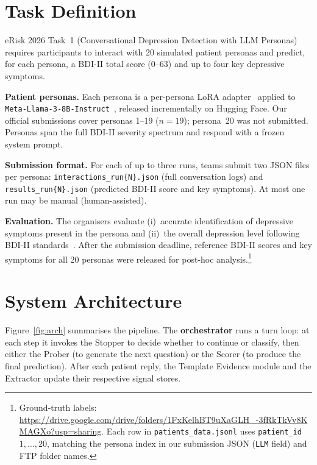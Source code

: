 \documentclass[]{ceurart}
\begin{document}
\section{Task Definition}\label{sec:task}

eRisk 2026 Task~1 (Conversational Depression Detection with LLM Personas) requires participants to interact with 20 simulated patient personas and predict, for each persona, a BDI-II total score (0--63) and up to four key depressive symptoms.

\textbf{Patient personas.}
Each persona is a per-persona LoRA adapter~\cite{Hu2022lora} applied to \texttt{Meta-Llama-3-8B-Instruct}~\cite{Dubey2024llama3}, released incrementally on Hugging Face.
Our official submissions cover personas 1--19 ($n=19$); persona~20 was not submitted.
Personas span the full BDI-II severity spectrum and respond with a frozen system prompt.

\textbf{Submission format.}
For each of up to three runs, teams submit two JSON files per persona: \texttt{interactions\_run\{N\}.json} (full conversation logs) and \texttt{results\_run\{N\}.json} (predicted BDI-II score and key symptoms).
At most one run may be manual (human-assisted).

\textbf{Evaluation.}
The organisers evaluate (i)~accurate identification of depressive symptoms present in the persona and (ii)~the overall depression level following BDI-II standards~\cite{PerezEtAl2026eRiskWorkingNotes}.
After the submission deadline, reference BDI-II scores and key symptoms for all 20 personas were released for post-hoc analysis.\footnote{Ground-truth labels: \url{https://drive.google.com/drive/folders/1FxKelhBT9uXaGLH_-3fRkTkVv8KMAGXo?usp=sharing}. Each row in \texttt{patients\_data.jsonl} uses \texttt{patient\_id}~$1,\ldots,20$, matching the persona index in our submission JSON (\texttt{LLM} field) and FTP folder names.}


\section{System Architecture}\label{sec:arch}

Figure~\ref{fig:arch} summarises the pipeline.
The \textbf{orchestrator} runs a turn loop: at each step it invokes the Stopper to decide whether to continue or classify, then either the Prober (to generate the next question) or the Scorer (to produce the final prediction).
After each patient reply, the Template Evidence module and the Extractor update their respective signal stores.
\end{document}
